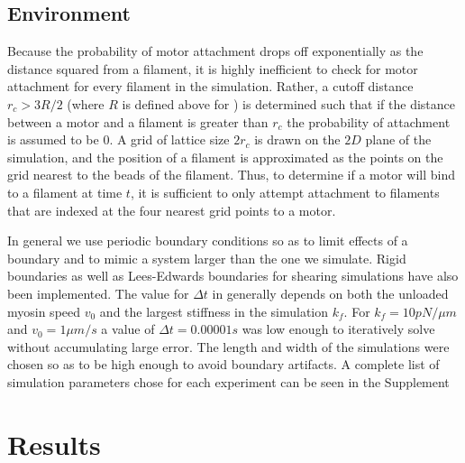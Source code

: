 \documentclass[12pt]{article}
\begin{document}
\subsection{Environment}
\par
Because the probability of motor attachment drops off exponentially as the distance squared from a filament, it is
highly inefficient to check for motor attachment for every filament in the simulation. Rather, a cutoff distance
$r_c>3R/2$ (where $R$ is defined above for )
is determined such that if the distance between a motor and a filament is greater than $r_c$ the probability of
attachment is assumed to be $0$. A grid of lattice size $2r_c$ is drawn on the
$2D$ plane of the simulation, and the position of a filament is approximated as the points on the grid nearest to the
beads of the filament. Thus, to determine if a motor will bind to a filament at time $t$, it is sufficient to
only attempt attachment to filaments that are indexed at the four nearest grid points to a motor. 
\par
In general we use periodic boundary conditions so as to limit effects of a boundary and to mimic a system larger than
the one we simulate. Rigid boundaries as well as Lees-Edwards boundaries for shearing simulations have also been
implemented. The value for $\Delta t$ in  generally depends on both the unloaded myosin speed
$v_0$ and the largest stiffness in the simulation $k_f$. For $k_f = 10pN/\mu m$ and $v_0=1\mu m/s$ a value of $\Delta t =
0.00001 s$ was low enough to iteratively solve  without accumulating large error. 
The length and width of the simulations were chosen so as to be high enough to avoid boundary artifacts. 
A complete list of simulation parameters chose for each experiment can be seen in the Supplement
\section{Results}
\end{document}

